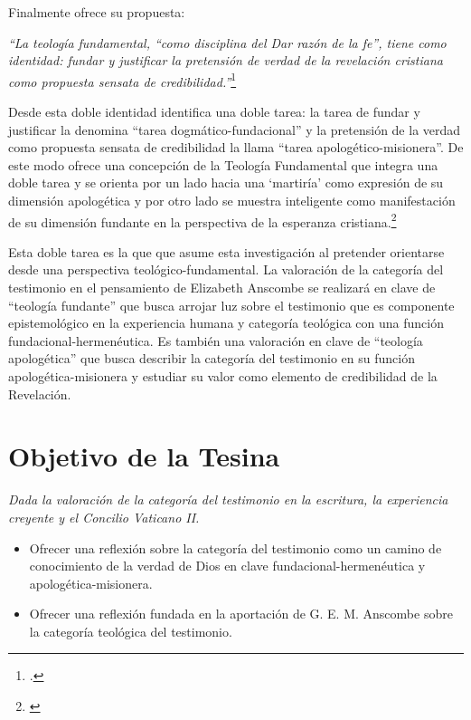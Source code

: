 \documentclass[11pt]{article}
\begin{document}
Finalmente ofrece su propuesta:

\emph{
``La teología fundamental, ``como disciplina del Dar razón de la fe'', tiene como identidad: fundar y justificar la pretensión de verdad de la revelación cristiana como propuesta sensata de credibilidad.''}\footcite[72]{ninotTF}

Desde esta doble identidad identifica una doble tarea: la tarea de fundar y justificar la denomina ``tarea dogmático-fundacional'' y la pretensión de la verdad como propuesta sensata de credibilidad la llama ``tarea apologético-misionera''. De este modo ofrece una concepción de la Teología Fundamental que integra una doble tarea y se orienta por un lado hacia una `martiría' como expresión de su dimensión apologética y por otro lado se muestra inteligente como manifestación de su dimensión fundante en la perspectiva de la esperanza cristiana.\footnote{\cite[72]{ninotTF}}

Esta doble tarea es la que que asume esta investigación al pretender orientarse desde una perspectiva teológico-fundamental. La valoración de la categoría del testimonio en el pensamiento de Elizabeth Anscombe se realizará en clave de ``teología fundante'' que busca arrojar luz sobre el testimonio que es componente epistemológico en la experiencia humana y categoría teológica con una función fundacional-hermenéutica. Es también una valoración en clave de ``teología apologética'' que busca describir la categoría del testimonio en su función apologética-misionera y estudiar su valor como elemento de credibilidad de la Revelación.


\printbibliography[title={Referencias usadas en la presentación:}]

\part*{Objetivo de la Tesina}

\emph{Dada la valoración de la categoría del testimonio en la escritura, la experiencia creyente y el Concilio Vaticano II.}
\begin{itemize}
  \item Ofrecer una reflexión sobre la categoría del testimonio como un camino de conocimiento de la verdad de Dios en clave fundacional-hermenéutica y apologética-misionera.
  \item Ofrecer una reflexión fundada en la aportación de G. E. M. Anscombe sobre la categoría teológica del testimonio.
\end{itemize}
\end{document}
